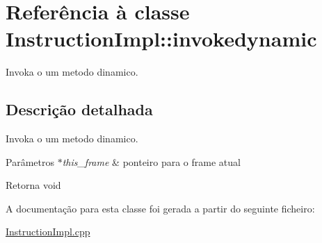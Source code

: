 \hypertarget{class_instruction_impl_1_1invokedynamic}{}\section{Referência à classe Instruction\+Impl\+:\+:invokedynamic}
\label{class_instruction_impl_1_1invokedynamic}


Invoka o um metodo dinamico.  




\subsection{Descrição detalhada}
Invoka o um metodo dinamico. 


\begin{DoxyParams}{Parâmetros}
{\em $\ast$this\+\_\+frame} & ponteiro para o frame atual \\
\hline
\end{DoxyParams}
\begin{DoxyReturn}{Retorna}
void 
\end{DoxyReturn}


A documentação para esta classe foi gerada a partir do seguinte ficheiro\+:\begin{DoxyCompactItemize}
\item 
\hyperlink{_instruction_impl_8cpp}{Instruction\+Impl.\+cpp}\end{DoxyCompactItemize}
